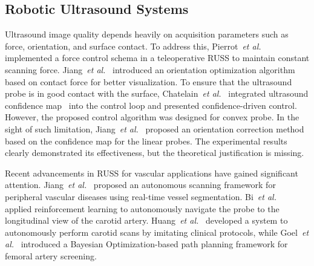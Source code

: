 \subsection{Robotic Ultrasound Systems}
Ultrasound image quality depends heavily on acquisition parameters such as force, orientation, and surface contact. To address this, Pierrot~\emph{et al.}~\cite{pierrot1999hippocrate} implemented a force control schema in a teleoperative RUSS to maintain constant scanning force. Jiang~\emph{et al.}~\cite{jiang2020automatic} introduced an orientation optimization algorithm based on contact force for better visualization.
To ensure that the ultrasound probe is in good contact with the surface, Chatelain~\emph{et al.}~\cite{chatelain2017confidence} integrated ultrasound confidence map~\cite{karamalis2012ultrasound} into the control loop and presented confidence-driven control. However, the proposed control algorithm was designed for convex probe. In the sight of such limitation, Jiang~\emph{et al.}~\cite{jiang2022precise} proposed an orientation correction method based on the confidence map for the linear probes. The experimental results clearly demonstrated its effectiveness, but the theoretical justification is missing.

\par
Recent advancements in RUSS for vascular applications have gained significant attention. Jiang~\emph{et al.}~\cite{jiang2021autonomous} proposed an autonomous scanning framework for peripheral vascular diseases using real-time vessel segmentation. Bi~\emph{et al.}~\cite{bi2022vesnet} applied reinforcement learning to autonomously navigate the probe to the longitudinal view of the carotid artery. Huang~\emph{et al.}~\cite{huangQ2024robot} developed a system to autonomously perform carotid scans by imitating clinical protocols, while Goel~\emph{et al.}~\cite{goel2022autonomous} introduced a Bayesian Optimization-based path planning framework for femoral artery screening.

\par
{}


